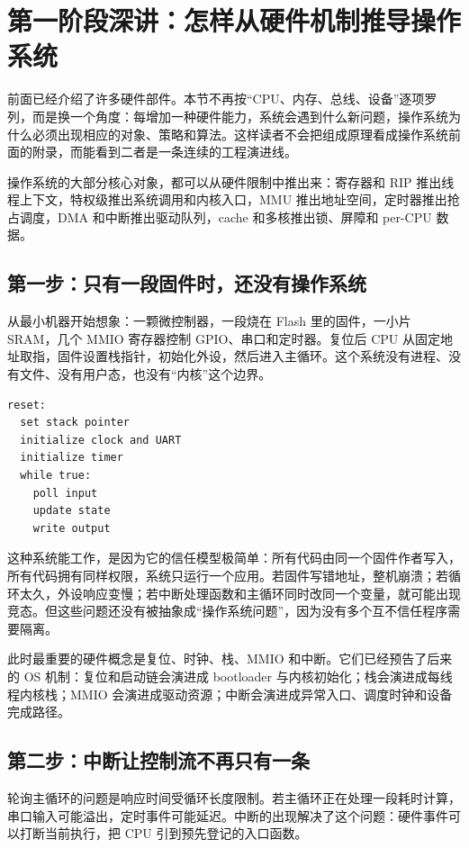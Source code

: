 \section{第一阶段深讲：怎样从硬件机制推导操作系统}

前面已经介绍了许多硬件部件。本节不再按“CPU、内存、总线、设备”逐项罗列，而是换一个角度：每增加一种硬件能力，系统会遇到什么新问题，操作系统为什么必须出现相应的对象、策略和算法。这样读者不会把组成原理看成操作系统前面的附录，而能看到二者是一条连续的工程演进线。

\begin{keyidea}
操作系统的大部分核心对象，都可以从硬件限制中推出来：寄存器和 RIP 推出线程上下文，特权级推出系统调用和内核入口，MMU 推出地址空间，定时器推出抢占调度，DMA 和中断推出驱动队列，cache 和多核推出锁、屏障和 per-CPU 数据。
\end{keyidea}

\subsection{第一步：只有一段固件时，还没有操作系统}

从最小机器开始想象：一颗微控制器，一段烧在 Flash 里的固件，一小片 SRAM，几个 MMIO 寄存器控制 GPIO、串口和定时器。复位后 CPU 从固定地址取指，固件设置栈指针，初始化外设，然后进入主循环。这个系统没有进程、没有文件、没有用户态，也没有“内核”这个边界。

\begin{lstlisting}
reset:
  set stack pointer
  initialize clock and UART
  initialize timer
  while true:
    poll input
    update state
    write output
\end{lstlisting}

这种系统能工作，是因为它的信任模型极简单：所有代码由同一个固件作者写入，所有代码拥有同样权限，系统只运行一个应用。若固件写错地址，整机崩溃；若循环太久，外设响应变慢；若中断处理函数和主循环同时改同一个变量，就可能出现竞态。但这些问题还没有被抽象成“操作系统问题”，因为没有多个互不信任程序需要隔离。

此时最重要的硬件概念是复位、时钟、栈、MMIO 和中断。它们已经预告了后来的 OS 机制：复位和启动链会演进成 bootloader 与内核初始化；栈会演进成每线程内核栈；MMIO 会演进成驱动资源；中断会演进成异常入口、调度时钟和设备完成路径。

\subsection{第二步：中断让控制流不再只有一条}

轮询主循环的问题是响应时间受循环长度限制。若主循环正在处理一段耗时计算，串口输入可能溢出，定时事件可能延迟。中断的出现解决了这个问题：硬件事件可以打断当前执行，把 CPU 引到预先登记的入口函数。

